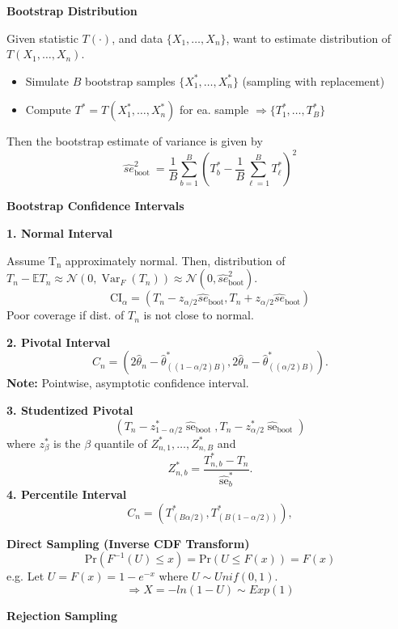 \documentclass[a4paper]{article}
\newcommand{\subheading}[1]{{\scriptsize\textbf{#1}}}
\begin{document}
\begin{multicols*}{4}
\smallskip
\hline
\smallskip

\subheading{Bootstrap Distribution}

Given statistic $T(\cdot)$, and data $\{X_1,\dots,X_n\}$, want to estimate distribution of $T(X_1,\dots,X_n)$.
\begin{itemize}
    \item Simulate $B$ bootstrap samples $\{X_1^*,\dots,X_n^*\}$ (sampling with replacement) 
    \item Compute $T^* = T(X_1^{*},\dots,X_n^{*})$ for ea. sample $\Rightarrow \{T_1^*,\dots,T_B^*\}$
\end{itemize}
Then the bootstrap estimate of variance is given by
$$
\hat{se}^2_{\text {boot }}=\frac{1}{B} \sum_{b=1}^B\left(T_{b}^*-\frac{1}{B} \sum_{\ell=1}^B T_{\ell}^*\right)^2
$$

\hline
\smallskip
\subheading{Bootstrap Confidence Intervals}

\subheading{1. Normal Interval}

Assume $\mathrm{T}_{\mathrm{n}}$ approximately normal. Then,  distribution of $T_n-\mathbb{E} T_n \approx \mathcal{N}\left(0, \operatorname{Var}_F\left(T_n\right)\right) \approx \mathcal{N}(0, \hat{se}_{\text{boot}}^2)$.
$$
\mathrm{CI}_\alpha=\left(T_n-z_{\alpha / 2} \hat{se}_{\text{boot}}, T_n+z_{\alpha / 2} \hat{se}_{\text{boot}}\right)
$$
Poor coverage if dist. of $T_n$ is not close to normal.

\subheading{2. Pivotal Interval}
$$
C_n=\left(2 \widehat{\theta}_n-\widehat{\theta}_{((1-\alpha / 2) B)}^*, 2 \widehat{\theta}_n-\widehat{\theta}_{((\alpha / 2) B)}^*\right) .
$$
\textbf{Note:} Pointwise, asymptotic confidence interval.

\subheading{3. Studentized Pivotal}
$$
\left(T_n-z_{1-\alpha / 2}^* \widehat{\operatorname{se}}_{\mathrm{boot}}, T_n-z_{\alpha / 2}^* \widehat{\operatorname{se}}_{\mathrm{boot}}\right)
$$
where $z_\beta^*$ is the $\beta$ quantile of $Z_{n, 1}^*, \ldots, Z_{n, B}^*$ and
$$
Z_{n, b}^*=\frac{T_{n, b}^*-T_n}{\hat{\operatorname{se}}_b^*} .
$$
\subheading{4. Percentile Interval}
$$
C_n=\left(T_{(B \alpha / 2)}^*, T_{(B(1-\alpha / 2))}^*\right),
$$
\hline
\smallskip

\subheading{Direct Sampling (Inverse CDF Transform)}
$$
\text{Pr}(F^{-1}(U)\leq x)=\text{Pr}(U \leq F(x)) = F(x)
$$
e.g. Let $U = F(x) = 1-e^{-x}$ where $U \sim Unif(0,1)$. $$\Rightarrow X = -ln(1-U) \sim Exp(1)$$

\subheading{Rejection Sampling}


\end{multicols*}
\end{document}
